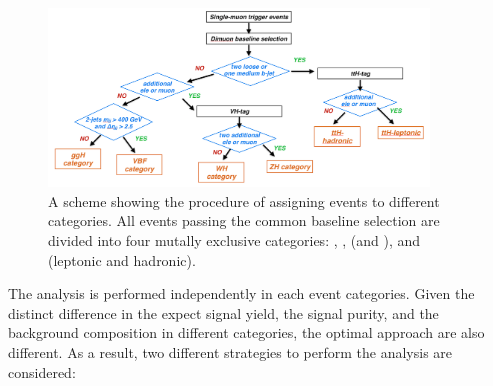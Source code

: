 \begin{figure}[!htb]
    \centering
    \captionsetup{justification=justified}
    \includegraphics[width=0.9\textwidth]{pics/category_scheme.png}
    \caption{A scheme showing the procedure of assigning events to different categories. All events passing the common baseline selection
             are divided into four mutally exclusive categories: \ggH, \qqH, \VH (\WH and \ZH), and \ttH (leptonic and hadronic).}
    \label{fig:event_categories}
\end{figure}

The analysis is performed independently in each event categories. 
Given the distinct difference in the expect signal yield, the signal purity, and the background composition in different categories, 
the optimal approach are also different.
As a result, two different strategies to perform the analysis are considered:

